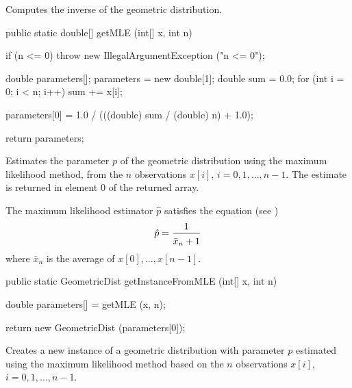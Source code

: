 \begin{tabb} Computes the inverse of the geometric
 distribution.
\end{tabb}
\begin{code}

   public static double[] getMLE (int[] x, int n)\begin{hide} {
      if (n <= 0)
         throw new IllegalArgumentException ("n <= 0");

      double parameters[];
      parameters = new double[1];
      double sum = 0.0;
      for (int i = 0; i < n; i++) {
         sum += x[i];
      }

      parameters[0] = 1.0 / (((double) sum / (double) n) + 1.0);

      return parameters;
   }\end{hide}
\end{code}
\begin{tabb}
   Estimates the parameter $p$ of the geometric distribution
   using the maximum likelihood method, from the $n$ observations
   $x[i]$, $i = 0, 1, \ldots, n-1$. The estimate is returned in element 0
   of the returned array.
   \begin{detailed}
   The maximum likelihood estimator $\hat{p}$ satisfies the equation
   (see \cite[page 323]{sLAW00a})
   \begin{eqnarray*}
      \hat{p} = \frac{1}{\bar{x}_n + 1\rule{0pt}{1em}}
   \end{eqnarray*}
   where  $\bar{x}_n$ is the average of $x[0], \ldots, x[n-1]$.
   \end{detailed}
\end{tabb}
\begin{htmlonly}
\end{htmlonly}
\begin{code}

   public static GeometricDist getInstanceFromMLE (int[] x, int n)\begin{hide} {

      double parameters[] = getMLE (x, n);

      return new GeometricDist (parameters[0]);
   }\end{hide}
\end{code}
\begin{tabb}
   Creates a new instance of a geometric distribution with parameter $p$
   estimated using the maximum likelihood method based on the $n$
   observations $x[i]$, $i = 0, 1, \ldots, n-1$.
\end{tabb}

